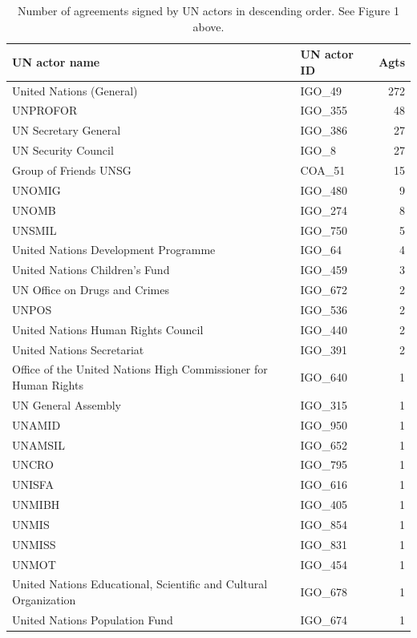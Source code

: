 \documentclass{article}
\begin{document}
\begin{table}[H]
\begin{center}
\small
\begin{tabularx}{\textwidth}{|X|l|r|}
    \hline
    \textbf{UN actor name} & \textbf{UN actor ID}  & \textbf{Agts} \\
    \hline
    \hline
United Nations (General) & IGO\_49 & 272 \\
\hline
UNPROFOR & IGO\_355 & 48 \\
\hline
UN Secretary General & IGO\_386 & 27 \\
\hline
UN Security Council & IGO\_8 & 27 \\
\hline
Group of Friends UNSG & COA\_51 & 15 \\
\hline
UNOMIG & IGO\_480 & 9 \\
\hline
UNOMB & IGO\_274 & 8 \\
\hline
UNSMIL & IGO\_750 & 5 \\
\hline
United Nations Development Programme & IGO\_64 & 4 \\
\hline
United Nations Children's Fund & IGO\_459 & 3 \\
\hline
UN Office on Drugs and Crimes & IGO\_672 & 2 \\
\hline
UNPOS & IGO\_536 & 2 \\
\hline
United Nations Human Rights Council & IGO\_440 & 2 \\
\hline
United Nations Secretariat & IGO\_391 & 2 \\
\hline
Office of the United Nations High Commissioner for Human Rights & IGO\_640 & 1 \\
\hline
UN General Assembly & IGO\_315 & 1 \\
\hline
UNAMID & IGO\_950 & 1 \\
\hline
UNAMSIL & IGO\_652 & 1 \\
\hline
UNCRO & IGO\_795 & 1 \\
\hline
UNISFA & IGO\_616 & 1 \\
\hline
UNMIBH & IGO\_405 & 1 \\
\hline
UNMIS & IGO\_854 & 1 \\
\hline
UNMISS & IGO\_831 & 1 \\
\hline
UNMOT & IGO\_454 & 1 \\
\hline
United Nations Educational, Scientific and Cultural Organization & IGO\_678 & 1 \\
\hline
United Nations Population Fund & IGO\_674 & 1 \\
\hline
\end{tabularx}
\end{center}
\normalsize
\caption{Number of agreements signed by UN actors in descending order. See Figure 1 above.}
\end{table}
\end{document}
